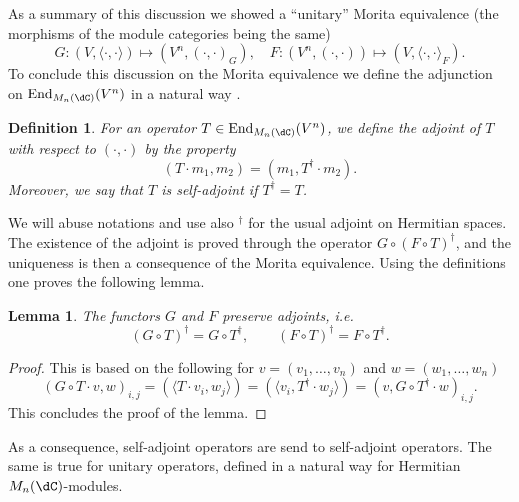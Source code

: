 \documentclass[a4paper,reqno]{amsart}
\DeclareMathOperator\End{ End}
\newtheorem{lemma}[theorem]{Lemma}
\newtheorem{definition}[theorem]{Definition}
\theoremstyle{definition}
\numberwithin{equation}{section}
\begin{document}
As a summary of this discussion we showed a ``unitary'' Morita equivalence (the morphisms of the module categories being the same)
\begin{equation}
G :(V,\langle\cdot,\cdot\rangle) \mapsto (V^n,(\cdot,\cdot)_G),\quad F :(V^n,(\cdot,\cdot))\mapsto (V,\langle\cdot,\cdot\rangle_F).
\end{equation}
To conclude this discussion on the Morita equivalence we define the adjunction on $\End_{M_n(\dC)}(V^n)$ in a natural way .

\begin{definition}
For an operator $T\in \End_{M_n(\dC)}(V^n)$, we define the adjoint of $T$ with respect to  $(\cdot,\cdot)$ by the property
\begin{equation}
    (T\cdot m_1,m_2)=(m_1,T^\dagger \cdot m_2).
\end{equation}
Moreover, we say that $T$ is self-adjoint if $T^\dagger=T$. 
\end{definition}

We will abuse notations and use also ${}^\dagger$ for the usual adjoint on Hermitian spaces. The existence of the adjoint is proved through the operator $G\circ (F\circ T)^{\dagger}$, and the uniqueness is then a consequence of the Morita equivalence. Using the definitions one proves the following lemma. 
\begin{lemma}
    The functors $G$ and $F$ preserve adjoints, i.e. 
    \begin{equation}
    (G\circ T)^\dagger= G\circ T^\dagger, \qquad (F\circ T)^\dagger= F\circ T^\dagger. 
    \end{equation}
\end{lemma}

\begin{proof}
   This is based on the following for $v=(v_1,\ldots,v_n)$ and $w=(w_1,\ldots, w_n)$
    \begin{equation}
    (G\circ T \cdot v,w)_{i,j}=(\langle T\cdot v_i,w_j\rangle)=(\langle v_i, T^\dagger \cdot w_j\rangle)=(v,G\circ T^\dagger \cdot w)_{i,j}. 
    \end{equation}
    This concludes the proof of the lemma. 
\end{proof}

As a consequence, self-adjoint operators are send to self-adjoint operators. The same is true for unitary operators, defined in a natural way for Hermitian $M_n(\dC)$-modules. 

\end{document}

